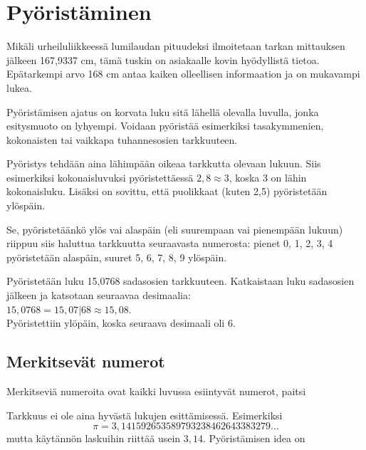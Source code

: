 \section{Pyöristäminen}

Mikäli urheiluliikkeessä lumilaudan pituudeksi ilmoitetaan tarkan mittauksen jälkeen 167,9337 cm, tämä tuskin on asiakaalle kovin hyödyllistä tietoa. Epätarkempi arvo 168 cm antaa kaiken olleellisen informaation ja on mukavampi lukea.

Pyöristämisen ajatus on korvata luku sitä lähellä olevalla luvulla, jonka esitysmuoto on lyhyempi. Voidaan pyöristää
esimerkiksi tasakymmenien, kokonaisten tai vaikkapa tuhannesosien
tarkkuuteen.

Pyöristys tehdään aina lähimpään oikeaa tarkkutta olevaan lukuun. Siis esimerkiksi kokonaisluvuksi pyöristettäessä $2,8 \approx 3$, koska 3 on lähin kokonaisluku. Lisäksi on sovittu, että
puolikkaat (kuten 2,5) pyöristetään ylöspäin.

Se, pyöristetäänkö ylös vai alaspäin (eli suurempaan vai
pienempään lukuun) riippuu siis haluttua tarkkuutta
seuraavasta numerosta: pienet
0, 1, 2, 3, 4 pyöristetään alaspäin, suuret 5, 6, 7, 8, 9 ylöspäin.

\begin{esimerkki}
Pyöristetään luku 15,0768 sadasosien tarkkuuteen. Katkaistaan
luku sadasosien jälkeen ja katsotaan seuraavaa desimaalia:\\
$15,0768 = 15,07|68 \approx 15,08$.\\
Pyöristettiin ylöpäin, koska seuraava desimaali oli 6.
\end{esimerkki}


\subsection*{Merkitsevät numerot}

Merkitseviä numeroita ovat kaikki luvussa esiintyvät numerot, paitsi 

Tarkkuus ei ole aina hyvästä lukujen esittämisessä. Esimerkiksi
\[ \pi = 3,141592653589793238462643383279 \ldots \]
mutta käytännön laskuihin riittää usein $3,14$. Pyöristämisen idea on 